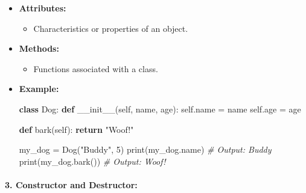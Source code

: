 \documentclass[11pt]{article}
\providecommand{\tightlist}{%
      \setlength{\itemsep}{0pt}\setlength{\parskip}{0pt}}
\newenvironment{Shaded}{}{}
\newcommand{\KeywordTok}[1]{\textcolor[rgb]{0.00,0.44,0.13}{\textbf{{#1}}}}
\newcommand{\DecValTok}[1]{\textcolor[rgb]{0.25,0.63,0.44}{{#1}}}
\newcommand{\StringTok}[1]{\textcolor[rgb]{0.25,0.44,0.63}{{#1}}}
\newcommand{\CommentTok}[1]{\textcolor[rgb]{0.38,0.63,0.69}{\textit{{#1}}}}
\newcommand{\FunctionTok}[1]{\textcolor[rgb]{0.02,0.16,0.49}{{#1}}}
\newcommand{\NormalTok}[1]{{#1}}
\newcommand{\VariableTok}[1]{\textcolor[rgb]{0.10,0.09,0.49}{{#1}}}
\newcommand{\ControlFlowTok}[1]{\textcolor[rgb]{0.00,0.44,0.13}{\textbf{{#1}}}}
\newcommand{\OperatorTok}[1]{\textcolor[rgb]{0.40,0.40,0.40}{{#1}}}
\newcommand{\BuiltInTok}[1]{{#1}}
\begin{document}
\begin{itemize}
\item
  \textbf{Attributes:}

  \begin{itemize}
  \tightlist
  \item
    Characteristics or properties of an object.
  \end{itemize}
\item
  \textbf{Methods:}

  \begin{itemize}
  \tightlist
  \item
    Functions associated with a class.
  \end{itemize}
\item
  \textbf{Example:}

\begin{Shaded}
\begin{Highlighting}[]
\KeywordTok{class}\NormalTok{ Dog:}
    \KeywordTok{def} \FunctionTok{__init__}\NormalTok{(}\VariableTok{self}\NormalTok{, name, age):}
        \VariableTok{self}\NormalTok{.name }\OperatorTok{=}\NormalTok{ name}
        \VariableTok{self}\NormalTok{.age }\OperatorTok{=}\NormalTok{ age}

    \KeywordTok{def}\NormalTok{ bark(}\VariableTok{self}\NormalTok{):}
        \ControlFlowTok{return} \StringTok{"Woof!"}

\NormalTok{my_dog }\OperatorTok{=}\NormalTok{ Dog(}\StringTok{"Buddy"}\NormalTok{, }\DecValTok{5}\NormalTok{)}
\BuiltInTok{print}\NormalTok{(my_dog.name)  }\CommentTok{# Output: Buddy}
\BuiltInTok{print}\NormalTok{(my_dog.bark())  }\CommentTok{# Output: Woof!}
\end{Highlighting}
\end{Shaded}
\end{itemize}

\paragraph{\texorpdfstring{3. \textbf{Constructor and
Destructor:}}{3. Constructor and Destructor:}}\label{constructor-and-destructor}
\end{document}
